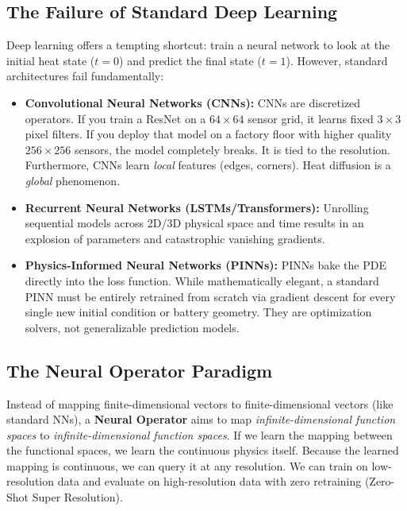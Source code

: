 \documentclass[12pt,a4paper]{article}
\begin{document}
\subsection{The Failure of Standard Deep Learning}
Deep learning offers a tempting shortcut: train a neural network to look at the initial heat state ($t=0$) and predict the final state ($t=1$). 
However, standard architectures fail fundamentally:
\begin{itemize}
    \item \textbf{Convolutional Neural Networks (CNNs):} CNNs are discretized operators. If you train a ResNet on a $64 \times 64$ sensor grid, it learns fixed $3 \times 3$ pixel filters. If you deploy that model on a factory floor with higher quality $256 \times 256$ sensors, the model completely breaks. It is tied to the resolution. Furthermore, CNNs learn \textit{local} features (edges, corners). Heat diffusion is a \textit{global} phenomenon.
    \item \textbf{Recurrent Neural Networks (LSTMs/Transformers):} Unrolling sequential models across 2D/3D physical space and time results in an explosion of parameters and catastrophic vanishing gradients.
    \item \textbf{Physics-Informed Neural Networks (PINNs):} PINNs bake the PDE directly into the loss function. While mathematically elegant, a standard PINN must be entirely retrained from scratch via gradient descent for every single new initial condition or battery geometry. They are optimization solvers, not generalizable prediction models.
\end{itemize}

\subsection{The Neural Operator Paradigm}
Instead of mapping finite-dimensional vectors to finite-dimensional vectors (like standard NNs), a \textbf{Neural Operator} aims to map \textit{infinite-dimensional function spaces} to \textit{infinite-dimensional function spaces}. 
If we learn the mapping between the functional spaces, we learn the continuous physics itself. Because the learned mapping is continuous, we can query it at any resolution. We can train on low-resolution data and evaluate on high-resolution data with zero retraining (Zero-Shot Super Resolution).
\end{document}

